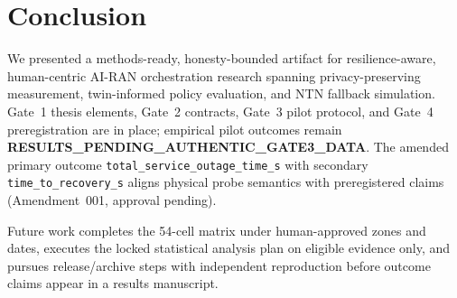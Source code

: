 \section{Conclusion}
\label{sec:conclusion}

We presented a methods-ready, honesty-bounded artifact for resilience-aware, human-centric AI-RAN orchestration research spanning privacy-preserving measurement, twin-informed policy evaluation, and NTN fallback simulation.
Gate~1 thesis elements, Gate~2 contracts, Gate~3 pilot protocol, and Gate~4 preregistration are in place; empirical pilot outcomes remain \textbf{RESULTS\_PENDING\_AUTHENTIC\_GATE3\_DATA}.
The amended primary outcome \texttt{total\_service\_outage\_time\_s} with secondary \texttt{time\_to\_recovery\_s} aligns physical probe semantics with preregistered claims (Amendment~001, approval pending).

Future work completes the 54-cell matrix under human-approved zones and dates, executes the locked statistical analysis plan on eligible evidence only, and pursues release/archive steps with independent reproduction before outcome claims appear in a results manuscript.
